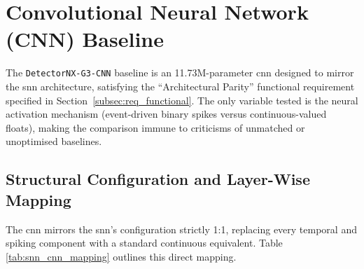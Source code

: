 \section{Convolutional Neural Network (CNN) Baseline}
\label{sec:cnn_baseline}

The \texttt{DetectorNX-G3-CNN} baseline is an 11.73M-parameter \gls{cnn} designed to mirror the \gls{snn} architecture, satisfying the ``Architectural Parity'' functional requirement specified in Section~\ref{subsec:req_functional}. The only variable tested is the neural activation mechanism (event-driven binary spikes versus continuous-valued floats), making the comparison immune to criticisms of unmatched or unoptimised baselines.

\subsection{Structural Configuration and Layer-Wise Mapping}
The \gls{cnn} mirrors the \gls{snn}'s configuration strictly 1:1, replacing every temporal and spiking component with a standard continuous equivalent. Table \ref{tab:snn_cnn_mapping} outlines this direct mapping.

